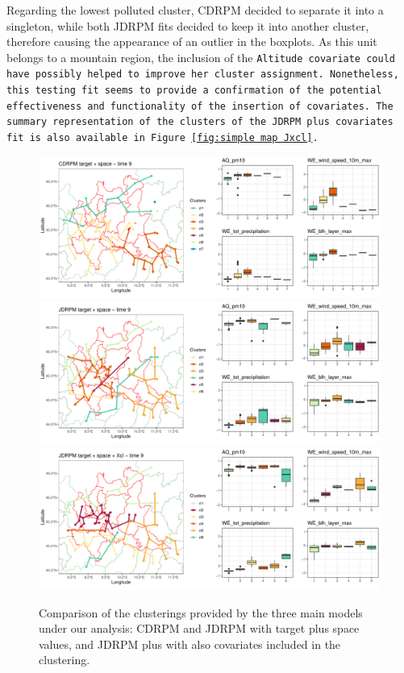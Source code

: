 \documentclass[12pt,	%
	a4paper,		%
	twoside,		%
	openright,		%
	titlepage,%
	]{book}
\theoremstyle{definition}
\begin{document}
Regarding the lowest polluted cluster, CDRPM decided to separate it into a singleton, while both JDRPM fits decided to keep it into another cluster, therefore causing the appearance of an outlier in the boxplots. As this unit belongs to a mountain region, the inclusion of the \tt{Altitude} covariate could have possibly helped to improve her cluster assignment. Nonetheless, this testing fit seems to provide a confirmation of the potential effectiveness and functionality of the insertion of covariates. The summary representation of the clusters of the JDRPM plus covariates fit is also available in Figure \ref{fig:simple map Jxcl}.


\begin{figure}[!ht]
    \centering
    \includegraphics[width=1\linewidth]{Testing/Covariates/in clustering/space C/CDRPM target + space_t09.pdf}
    \includegraphics[width=1\linewidth]{Testing/Covariates/in clustering/space J/JDRPM target + space_t09.pdf}
    \includegraphics[width=1\linewidth]{Testing/Covariates/in clustering/space J Xcl/JDRPM target + space + Xcl_t09.pdf}
    \caption[Comparison of the clusterings provided by the base fits plus JDRPM with covariates in the clustering]{Comparison of the clusterings provided by the three main models under our analysis: CDRPM and JDRPM with target plus space values, and JDRPM plus with also covariates included in the clustering.}
    \label{fig: summary fits battle}
\end{figure}
\end{document}
